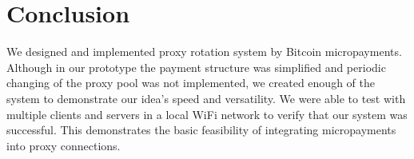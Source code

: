 \section{Conclusion}
\label{sec:conclusion}
We designed and implemented proxy rotation system by Bitcoin micropayments. Although in our prototype the payment structure was simplified and periodic changing of the proxy pool was not implemented, we created enough of the system to demonstrate our idea's speed and versatility. We were able to test with multiple clients and servers in a local WiFi network to verify that our system was successful. This demonstrates the basic feasibility of integrating micropayments into proxy connections.
